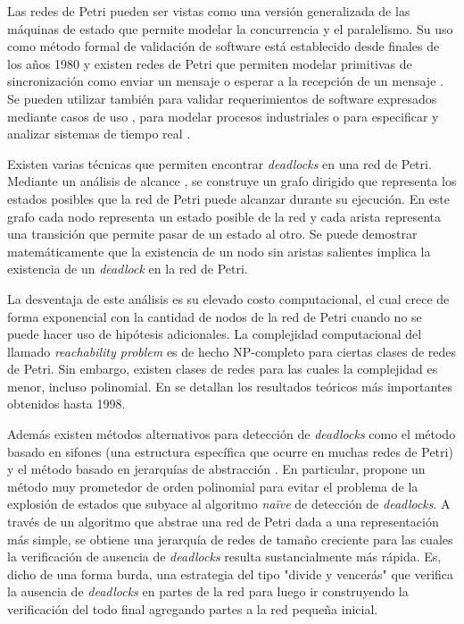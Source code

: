 \documentclass[12pt]{article}
\begin{document}
Las redes de Petri pueden ser vistas como una versión generalizada de las máquinas de estado que permite modelar la concurrencia y el paralelismo.
Su uso como método formal de validación de software está establecido desde finales de los años 1980 y
existen redes de Petri que permiten modelar primitivas de sincronización como enviar un mensaje o esperar a la recepción de un mensaje \cite{heiner1998}.
Se pueden utilizar también para validar requerimientos de software expresados mediante casos de uso \cite{silva-dossantos2004},
para modelar procesos industriales \cite{aalst1994} o para especificar y analizar sistemas de tiempo real \cite{kavi2011}.

Existen varias técnicas que permiten encontrar \textit{deadlocks} en una red de Petri.
Mediante un análisis de alcance \cite{murata1989}, se construye un grafo dirigido
que representa los estados posibles que la red de Petri puede alcanzar durante su ejecución.
En este grafo cada nodo representa un estado posible de la red y cada arista representa una transición que permite pasar de un estado al otro.
Se puede demostrar matemáticamente que la existencia de un nodo sin aristas salientes implica la existencia de un \textit{deadlock} en la red de Petri.

La desventaja de este análisis es su elevado costo computacional, el cual crece de forma exponencial
con la cantidad de nodos de la red de Petri cuando no se puede hacer uso de hipótesis adicionales.
La complejidad computacional del llamado \textit{reachability problem} es de hecho NP-completo para ciertas clases de redes de Petri.
Sin embargo, existen clases de redes para las cuales la complejidad es menor, incluso polinomial.
En \cite{esparza1994} se detallan los resultados teóricos más importantes obtenidos hasta 1998.

Además existen métodos alternativos para detección de \textit{deadlocks}
como el método basado en sifones (una estructura específica que ocurre en muchas redes de Petri) \cite{hu2011} y
el método basado en jerarquías de abstracción \cite{kungas2005}.
En particular, \cite{kungas2005} propone un método muy prometedor de orden polinomial para evitar el problema
de la explosión de estados que subyace al algoritmo \textit{naïve} de detección de \textit{deadlocks}.
A través de un algoritmo que abstrae una red de Petri dada a una representación más simple,
se obtiene una jerarquía de redes de tamaño creciente para las cuales la verificación de ausencia de \textit{deadlocks} resulta sustancialmente más rápida.
Es, dicho de una forma burda, una estrategia del tipo "divide y vencerás" que verifica la ausencia de \textit{deadlocks}
en partes de la red para luego ir construyendo la verificación del todo final agregando partes a la red pequeña inicial.
\end{document}
